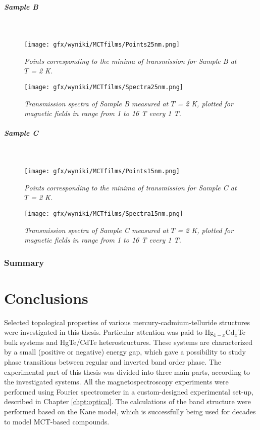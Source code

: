 \documentclass[titlepage,a4paper]{book}
\newcommand{\wciecie}{\quad\phantom{v}}
\newcommand{\myparagraph}[1]{\paragraph{#1}\mbox{}\\}
\begin{document}
\clearpage
\myparagraph{Sample B}
\begin{figure}[H]
	\centering
	\texttt{[image: gfx/wyniki/MCTfilms/Points25nm.png]}
	\vspace{-10pt}
	\caption{\textit{Points corresponding to the minima of transmission for Sample B at $T$ = 2 K.}}
	\label{fig:Points25nm}
\end{figure}
\begin{figure}[H]
	\centering
	\texttt{[image: gfx/wyniki/MCTfilms/Spectra25nm.png]}
	\vspace{-10pt}
	\caption{\textit{Transmission spectra of Sample B measured at $T$ = 2 K, plotted for magnetic fields in range from 1 to 16 T every 1 T.}}
	\label{fig:Spectra25nm}
\end{figure}

\clearpage
\myparagraph{Sample C}
\begin{figure}[H]
	\centering
	\texttt{[image: gfx/wyniki/MCTfilms/Points15nm.png]}
	\vspace{-10pt}
	\caption{\textit{Points corresponding to the minima of transmission for Sample C at $T$ = 2 K.}}
	\label{fig:Points15nm}
\end{figure}
\begin{figure}[H]
	\centering
	\texttt{[image: gfx/wyniki/MCTfilms/Spectra15nm.png]}
	\vspace{-10pt}
	\caption{\textit{Transmission spectra of Sample C measured at $T$ = 2 K, plotted for magnetic fields in range from 1 to 16 T every 1 T.}}
	\label{fig:Spectra15nm}
\end{figure}

\subsection{Summary}


\chapter{Conclusions}
\wciecie
Selected topological properties of various mercury-cadmium-telluride structures were investigated in this thesis. Particular attention was paid to Hg$_{1-x}$Cd$_{x}$Te bulk systems and HgTe/CdTe heterostructures. These systems are characterized by a small (positive or negative) energy gap, which gave a possibility to study phase transitions between regular and inverted band order phase. The experimental part of this thesis was divided into three main parts, according to the investigated systems. All the magnetospectroscopy experiments were performed using Fourier spectrometer in a custom-designed experimental set-up, described in Chapter \ref{chpt:optical}. The calculations of the band structure were performed based on the Kane model, which is successfully being used for decades to model MCT-based compounds.
\end{document}

